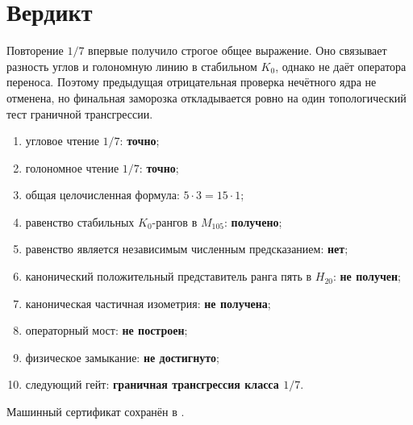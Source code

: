 \section{Вердикт}

Повторение $1/7$ впервые получило строгое общее выражение. Оно связывает
разность углов и голономную линию в стабильном $K_0$, однако не даёт
оператора переноса. Поэтому предыдущая отрицательная проверка нечётного
ядра не отменена, но финальная заморозка откладывается ровно на один
топологический тест граничной трансгрессии.

\begin{protocol}
\begin{enumerate}
 \item угловое чтение $1/7$: \textbf{точно};
 \item голономное чтение $1/7$: \textbf{точно};
 \item общая целочисленная формула: \textbf{$5\cdot3=15\cdot1$};
 \item равенство стабильных $K_0$-рангов в $M_{105}$:
 \textbf{получено};
 \item равенство является независимым численным предсказанием:
 \textbf{нет};
 \item канонический положительный представитель ранга пять в $H_{20}$:
 \textbf{не получен};
 \item каноническая частичная изометрия: \textbf{не получена};
 \item операторный мост: \textbf{не построен};
 \item физическое замыкание: \textbf{не достигнуто};
 \item следующий гейт:
 \textbf{граничная трансгрессия класса $1/7$}.
\end{enumerate}
\end{protocol}

Машинный сертификат сохранён в
.
